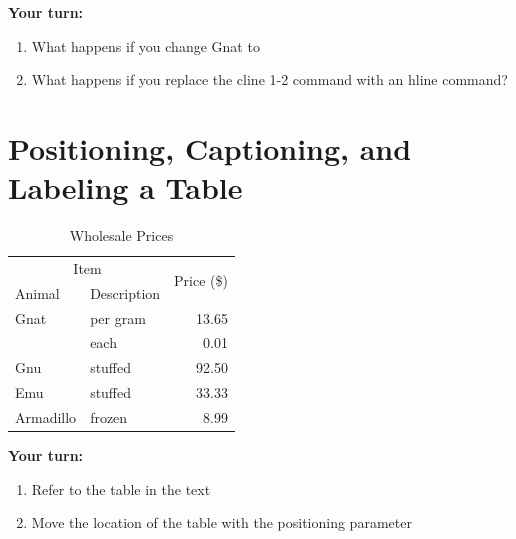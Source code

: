 \documentclass{article}
\begin{document}
 \bigskip
  
{\bf Your turn:} 
\begin{enumerate}
\item What happens if you change Gnat to %
\item What happens if you replace the cline 1-2 command with an hline command?  
\end{enumerate}
\clearpage
 \section{Positioning, Captioning, and Labeling a Table}

\begin{table}[b]
\centering
\begin{tabular}{|l|l|r|} \hline
  \multicolumn{2}{|c|}{Item} & \multirow{2}{*}{Price (\$)}\\ \cline{1-2}
  Animal & Description &  \\ \hline
  Gnat  & per gram & 13.65 \\
        & each     &  0.01 \\
  Gnu   & stuffed  & 92.50 \\
  Emu   & stuffed  & 33.33 \\
  Armadillo & frozen & 8.99 \\ \hline
 \end{tabular}
 \caption{\label{tab:prices}Wholesale Prices}
 \end{table}
  
 \bigskip
  
{\bf Your turn:} 
\begin{enumerate}
\item Refer to the table in the text
\item Move the location of the table with the positioning parameter
\end{enumerate}
\clearpage
\end{document}

